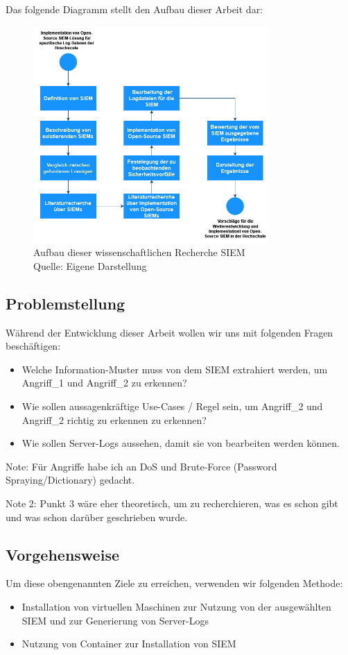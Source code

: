 Das folgende Diagramm stellt den Aufbau dieser Arbeit dar:

\begin{figure}[H]
   \centering
   \includegraphics[width=0.8\textwidth]{assets/1_p1.jpg}
   \caption{Aufbau dieser wissenschaftlichen Recherche \gls{SIEM} \\Quelle: Eigene Darstellung }
   \centering
\end{figure}


\subsection{Problemstellung}
Während der Entwicklung dieser Arbeit wollen wir uns mit folgenden Fragen beschäftigen:

\begin{itemize}
   \item Welche Information-Muster muss von dem \gls{SIEM} extrahiert werden, um Angriff\_1 und Angriff\_2 zu erkennen?
   \item Wie sollen aussagenkräftige Use-Cases / Regel sein, um Angriff\_2 und Angriff\_2 richtig zu erkennen zu erkennen?
   \item Wie sollen Server-Logs aussehen, damit sie von  bearbeiten werden können.
\end{itemize}

Note: Für Angriffe habe ich an DoS und Brute-Force (Password Spraying/Dictionary) gedacht.

Note 2: Punkt 3 wäre eher theoretisch, um zu recherchieren, was es schon gibt und was schon darüber geschrieben wurde.

\subsection{Vorgehensweise}
Um diese obengenannten Ziele zu erreichen, verwenden wir folgenden Methode:

\begin{itemize}[noitemsep]
   \item Installation von virtuellen Maschinen zur Nutzung von der ausgewählten \gls{SIEM} und zur Generierung von Server-Logs
   \item Nutzung von Container zur Installation von \gls{SIEM}
\end{itemize}

